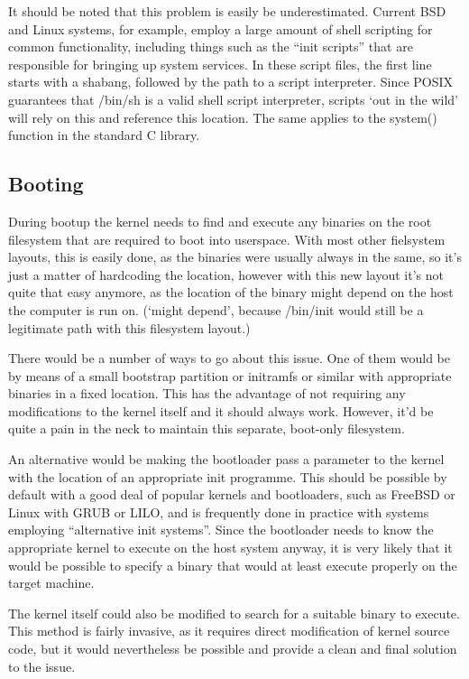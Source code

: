 \documentclass[a4paper,twoside,titlepage]{article}
\begin{document}
It should be noted that this problem is easily be underestimated. Current BSD
and Linux systems, for example, employ a large amount of shell scripting for
common functionality, including things such as the ``init scripts'' that are
responsible for bringing up system services. In these script files, the first
line starts with a shabang, followed by the path to a script interpreter. Since
POSIX guarantees that /bin/sh is a valid shell script interpreter, scripts `out
in the wild' will rely on this and reference this location. The same applies to
the system() function in the standard C library.

\subsection{Booting}
During bootup the kernel needs to find and execute any binaries on the root
filesystem that are required to boot into userspace. With most other fielsystem
layouts, this is easily done, as the binaries were usually always in the same,
so it's just a matter of hardcoding the location, however with this new layout
it's not quite that easy anymore, as the location of the binary might depend on
the host the computer is run on. (`might depend', because /bin/init would still
be a legitimate path with this filesystem layout.)

There would be a number of ways to go about this issue. One of them would be
by means of a small bootstrap partition or initramfs or similar with appropriate
binaries in a fixed location. This has the advantage of not requiring any
modifications to the kernel itself and it should always work. However, it'd be
quite a pain in the neck to maintain this separate, boot-only filesystem.

An alternative would be making the bootloader pass a parameter to the kernel
with the location of an appropriate init programme. This should be possible by
default with a good deal of popular kernels and bootloaders, such as FreeBSD or
Linux with GRUB or LILO, and is frequently done in practice with systems
employing ``alternative init systems''. Since the bootloader needs to know the
appropriate kernel to execute on the host system anyway, it is very likely that
it would be possible to specify a binary that would at least execute properly on
the target machine.

The kernel itself could also be modified to search for a suitable binary to
execute. This method is fairly invasive, as it requires direct modification of
kernel source code, but it would nevertheless be possible and provide a clean and
final solution to the issue.

\newpage

\begin{thebibliography}{alpha}

\end{thebibliography}
\end{document}
